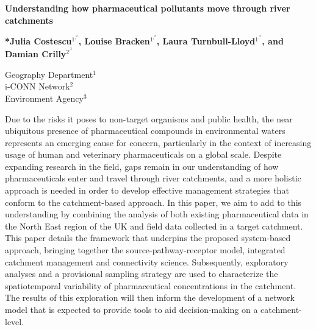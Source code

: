 \documentclass{article}
\renewenvironment{abstract}
 {\normalsize
  \begin{center}
  \bfseries \large \abstractname \vspace{-.5em}\vspace{0pt}
  \end{center}
  \list{}{
    \setlength{\leftmargin}{.5cm}%
    \setlength{\rightmargin}{\leftmargin}%
  }%
  \item\relax}
 {\endlist}
\begin{document}
    \begin{center}
          

        \Huge
        \textbf{Understanding how pharmaceutical pollutants move through river catchments}
     
        \vspace{0.5cm}
        
        \normalsize
        \textbf{*Julia Costescu$^1^,^2$, Louise Bracken$^1^,^2$,
          Laura Turnbull-Lloyd$^1^,^2$,
            and Damian Crilly$^2^,^3$}
        
        
        
    
        \normalsizie
        Geography Department$^1$\\
        i-CONN Network$^2$\\
        Environment Agency$^3$\\

            
    \end{center}




\vspace{0.5cm}
\begin{abstract} 
Due to the risks it poses to non-target organisms and public health, the near ubiquitous presence of pharmaceutical compounds in environmental waters represents an emerging cause for concern, particularly in the context of increasing usage of human and veterinary pharmaceuticals on a global scale. Despite expanding research in the field, gaps remain in our understanding of how pharmaceuticals enter and travel through river catchments, and a more holistic approach is needed in order to develop effective management strategies that conform to the catchment-based approach. In this paper, we aim to add to this understanding by combining the analysis of both existing pharmaceutical data in the North East region of the UK and field data collected in a target catchment. This paper details the framework that underpins the proposed system-based approach, bringing together the source-pathway-receptor model, integrated catchment management and connectivity science. Subsequently, exploratory analyses and a provisional sampling strategy are used to characterize the spatiotemporal variability of pharmaceutical concentrations in the catchment. The results of this exploration will then inform the development of a network model that is expected to provide tools to aid decision-making on a catchment-level.
\end{abstract}
\clearpage
\vspace{0.5cm}
\tableofcontents
\end{document}
